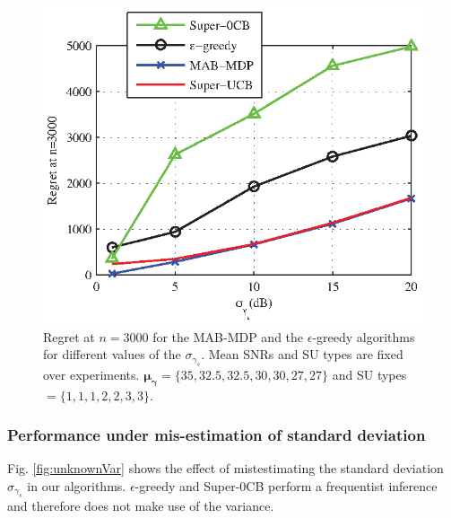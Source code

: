 \begin{figure}[!t]
\centering
\includegraphics{VsKnownVar.eps}
\caption{Regret at $n = 3000$ for the MAB-MDP and the $\epsilon$-greedy algorithms for different values of the $\sigma_{\gamma_s}$. Mean SNRs and SU types are fixed over experiments. $\boldsymbol{\mu_{\gamma}}=\{35,32.5,32.5,30,30,27,27\}$ and SU types $= \{1,1,1,2,2,3,3\}$.}
\label{fig:VsKnownVar}
\end{figure}

\subsubsection{Performance under mis-estimation of standard deviation}

Fig. \ref{fig:unknownVar} shows the effect of mistestimating the standard deviation $\sigma_{\gamma_s}$ in our algorithms. $\epsilon$-greedy and Super-0CB perform a frequentist inference and therefore does not make use of the variance.

